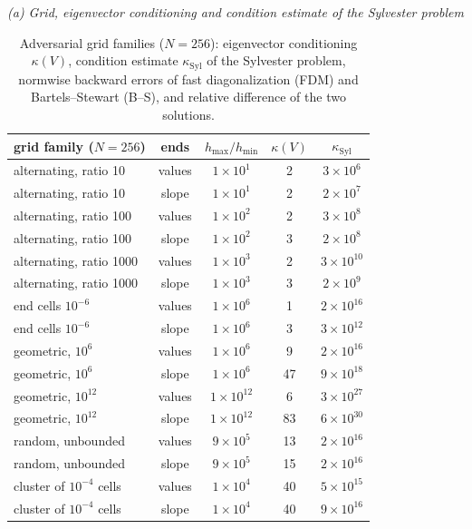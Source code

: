 \documentclass[11pt]{article}
\begin{document}
\begin{table}[htbp]\centering\small
\caption{Adversarial grid families ($N=256$): eigenvector conditioning $\kappa(V)$, condition estimate
$\kappa_{\mathrm{Syl}}$ of the Sylvester problem, normwise backward errors of fast diagonalization (FDM) and
Bartels--Stewart (B--S), and relative difference of the two solutions.}
\textit{(a) Grid, eigenvector conditioning and condition estimate of the Sylvester problem}\\[2pt]
\begin{tabular}{>{\raggedright\arraybackslash}p{}c c c c}
\toprule
grid family ($N=256$) & ends & $h_{\max}/h_{\min}$ & $\kappa(V)$ & $\kappa_{\mathrm{Syl}}$\\
\midrule
alternating, ratio 10 & values & $1{\times}10^{1}$ & 2 & $3{\times}10^{6}$\\
alternating, ratio 10 & slope & $1{\times}10^{1}$ & 2 & $2{\times}10^{7}$\\
alternating, ratio 100 & values & $1{\times}10^{2}$ & 2 & $3{\times}10^{8}$\\
alternating, ratio 100 & slope & $1{\times}10^{2}$ & 3 & $2{\times}10^{8}$\\
alternating, ratio 1000 & values & $1{\times}10^{3}$ & 2 & $3{\times}10^{10}$\\
alternating, ratio 1000 & slope & $1{\times}10^{3}$ & 3 & $2{\times}10^{9}$\\
end cells $10^{-6}$ & values & $1{\times}10^{6}$ & 1 & $2{\times}10^{16}$\\
end cells $10^{-6}$ & slope & $1{\times}10^{6}$ & 3 & $3{\times}10^{12}$\\
geometric, $10^6$ & values & $1{\times}10^{6}$ & 9 & $2{\times}10^{16}$\\
geometric, $10^6$ & slope & $1{\times}10^{6}$ & 47 & $9{\times}10^{18}$\\
geometric, $10^{12}$ & values & $1{\times}10^{12}$ & 6 & $3{\times}10^{27}$\\
geometric, $10^{12}$ & slope & $1{\times}10^{12}$ & 83 & $6{\times}10^{30}$\\
random, unbounded & values & $9{\times}10^{5}$ & 13 & $2{\times}10^{16}$\\
random, unbounded & slope & $9{\times}10^{5}$ & 15 & $2{\times}10^{16}$\\
cluster of $10^{-4}$ cells & values & $1{\times}10^{4}$ & 40 & $5{\times}10^{15}$\\
cluster of $10^{-4}$ cells & slope & $1{\times}10^{4}$ & 40 & $9{\times}10^{16}$\\
\bottomrule
\end{tabular}


\end{table}
\end{document}
